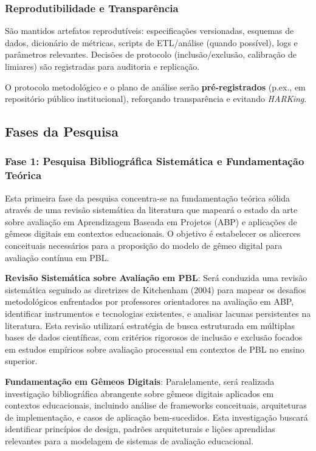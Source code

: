 \documentclass[12pt,a4paper]{article}
\begin{document}
\subsubsection{Reprodutibilidade e Transparência}

São mantidos artefatos reprodutíveis: especificações versionadas, esquemas de
dados, dicionário de métricas, scripts de ETL/análise (quando possível), logs e
parâmetros relevantes. Decisões de protocolo (inclusão/exclusão, calibração de
limiares) são registradas para auditoria e replicação.

O protocolo metodológico e o plano de análise serão \textbf{pré-registrados}
(p.ex., em repositório público institucional), reforçando transparência e
evitando \textit{HARKing}.

\subsection{Fases da Pesquisa}

\subsubsection{Fase 1: Pesquisa Bibliográfica Sistemática e Fundamentação Teórica}

Esta primeira fase da pesquisa concentra-se na fundamentação teórica sólida através de uma revisão sistemática da literatura que mapeará o estado da arte sobre avaliação em Aprendizagem Baseada em Projetos (ABP) e aplicações de gêmeos digitais em contextos educacionais. O objetivo é estabelecer os alicerces conceituais necessários para a proposição do modelo de gêmeo digital para avaliação contínua em PBL.

\textbf{Revisão Sistemática sobre Avaliação em PBL}: Será conduzida uma revisão sistemática seguindo as diretrizes de Kitchenham (2004) para mapear os desafios metodológicos enfrentados por professores orientadores na avaliação em ABP, identificar instrumentos e tecnologias existentes, e analisar lacunas persistentes na literatura. Esta revisão utilizará estratégia de busca estruturada em múltiplas bases de dados científicas, com critérios rigorosos de inclusão e exclusão focados em estudos empíricos sobre avaliação processual em contextos de PBL no ensino superior.

\textbf{Fundamentação em Gêmeos Digitais}: Paralelamente, será realizada investigação bibliográfica abrangente sobre gêmeos digitais aplicados em contextos educacionais, incluindo análise de frameworks conceituais, arquiteturas de implementação, e casos de aplicação bem-sucedidos. Esta investigação buscará identificar princípios de design, padrões arquiteturais e lições aprendidas relevantes para a modelagem de sistemas de avaliação educacional.
\end{document}
